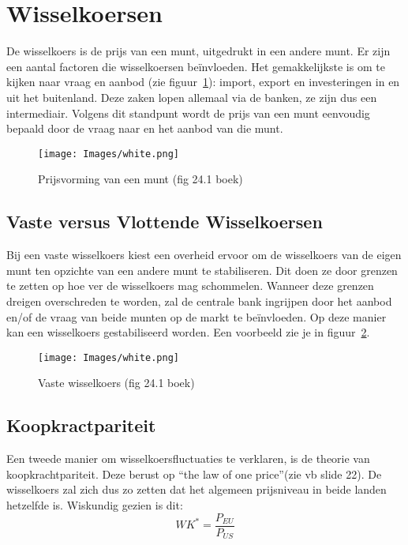 \section{Wisselkoersen}
De wisselkoers is de prijs van een munt, uitgedrukt in een andere munt. Er zijn een aantal factoren die wisselkoersen be\"invloeden. Het gemakkelijkste is om te kijken naar vraag en aanbod (zie figuur~\ref{fig:prijsVormingMunt}): import, export en investeringen in en uit het buitenland. Deze zaken lopen allemaal via de banken, ze zijn dus een intermediair. Volgens dit standpunt wordt de prijs van een munt eenvoudig bepaald door de vraag naar en het aanbod van die munt.

\begin{figure}[htbp]
	\centering
	\texttt{[image: Images/white.png]}
	\caption{Prijsvorming van een munt (fig 24.1 boek)}
	\label{fig:prijsVormingMunt}
\end{figure}

\subsection{Vaste versus Vlottende Wisselkoersen}
Bij een vaste wisselkoers kiest een overheid ervoor om de wisselkoers van de eigen munt ten opzichte van een andere munt te stabiliseren. Dit doen ze door grenzen te zetten op hoe ver de wisselkoers mag schommelen. Wanneer deze grenzen dreigen overschreden te worden, zal de centrale bank ingrijpen door het aanbod en/of de vraag van beide munten op de markt te be\"invloeden. Op deze manier kan een wisselkoers gestabiliseerd worden. Een voorbeeld zie je in figuur~\ref{fig:vasteWK}.

\begin{figure}[htbp]
	\centering
	\texttt{[image: Images/white.png]}
	\caption{Vaste wisselkoers (fig 24.1 boek)}
	\label{fig:vasteWK}
\end{figure}


\subsection{Koopkractpariteit}
Een tweede manier om wisselkoersfluctuaties te verklaren, is de theorie van koopkrachtpariteit. Deze berust op ``the law of one price''(zie vb slide 22). De wisselkoers zal zich dus zo zetten dat het algemeen prijsniveau in beide landen hetzelfde is. Wiskundig gezien is dit:
\begin{equation}
  WK^* = \frac{P_{EU}}{P_{US}}
\end{equation}

